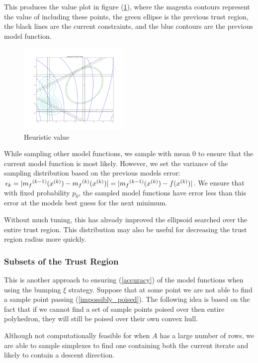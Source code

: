 \documentclass{article}
\let\oldref\ref
\renewcommand{\ref}[1]{(\oldref{#1})}
\begin{document}
This produces the value plot in figure \ref{hvalueplot}, where the magenta contours represent the value of including these points, the green ellipse is the previous trust region, the black lines are the current constraints, and the blue contours are the previous model function.

\begin{figure}[h]
    \centering
    \includegraphics[width=200px]{images/heuristic_value.png}
    \caption{Heuristic value}
    \label{hvalueplot}
\end{figure}



While sampling other model functions, we sample with mean $0$ to ensure that the current model function is most likely.
However, we set the variance of the sampling distribution based on the previous models error:
$\epsilon_k = |{{m}_f}^{(k-1)}({x}^{(k)}) - {{m}_f}^{(k)}({x}^{(k)})| = |{{m}_f}^{(k-1)}({x}^{(k)}) - f({x}^{(k)})|$.
We ensure that with fixed probability $p_0$, the sampled model functions have error less than this error at the models best guess for the next minimum.

Without much tuning, this has already improved the ellipsoid searched over the entire trust region.
This distribution may also be useful for decreasing the trust region radius more quickly.


\subsubsection{Subsets of the Trust Region}
\label{simplex_subset_algorithm}

This is another approach to ensuring \ref{accuracy} of the model functions when using the bumping $\xi$ strategy.
Suppose that at some point we are not able to find a sample point passing \ref{impossibly_poised}.
The following idea is based on the fact that if we cannot find a set of sample points poised over then entire polyhedron, they will still be poised over their own convex hull.

Although not computationally feasible for when $A$ has a large number of rows, we are able to sample simplexes to find one containing both the current iterate and likely to contain a descent direction.
\end{document}

